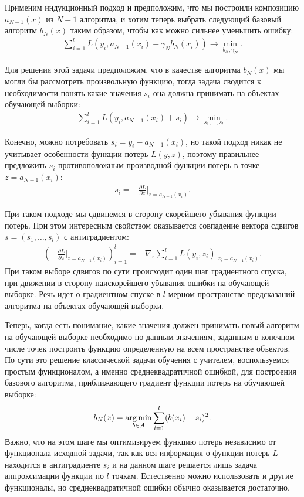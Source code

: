 \documentclass[12pt,a4paper]{article} %
\begin{document}
Применим индукционный подход и предположим, что мы построили композицию $a_{N-1}(x)$ из $N-1$ алгоритма, и хотим теперь выбрать следующий базовый алгоритм $b_N(x)$ таким образом, чтобы как можно сильнее уменьшить ошибку:
\begin{gather}\label{gradbust3}
	\sum\limits_{i=1}^{l}L(y_i, a_{N-1}(x_i)+\gamma_Nb_N(x_i)) \rightarrow \min_{b_N, \gamma_N}.
\end{gather}

Для решения этой задачи предположим, что в качестве алгоритма $b_N(x)$ мы могли бы рассмотреть произвольную функцию, тогда задача сводится к необходимости понять какие значения $s_i$ она должна принимать на  объектах обучающей выборки:
\begin{gather}\label{gradbust4}
	\sum\limits_{i=1}^{l}L(y_i, a_{N-1}(x_i)+s_i) \rightarrow \min_{s_1, \dots, s_l}.
\end{gather}

Конечно, можно потребовать $s_i = y_i-a_{N-1}(x_i)$, но такой подход никак не учитывает особенности функции потерь $L(y,z)$, поэтому правильнее предложить $s_i$ противоположным производной функции потерь в точке $z=a_{N-1}(x_i)$:
\begin{gather}\label{gradbust5}
	s_i = -\frac{\partial L}{\partial z}\bigg|_{z = a_{N-1}(x_i)}.
\end{gather}

При таком подходе мы сдвинемся в сторону скорейшего убывания функции потерь. При этом интересным свойством оказывается совпадение вектора сдвигов $s = (s_1,\dots, s_l)$ с антиградиентом:
\begin{gather}\label{gradbust6}
	\left(-\frac{\partial L}{\partial z}\bigg|_{z = a_{N-1}(x_i)}\right)_{i=1}^{l} = -\nabla_z\sum\limits_{i=1}^{l}L(y_i, z_i)|_{z_i = a_{N-1}(x_i)}.
\end{gather}
При таком выборе сдвигов по сути происходит один шаг градиентного спуска, при движении в сторону наискорейшего убывания ошибки на обучающей выборке. Речь идет о градиентном спуске в $l$-мерном пространстве предсказаний алгоритма на объектах обучающей выборки. 

Теперь, когда есть понимание, какие значения должен принимать новый алгоритм на обучающей выборке необходимо по данным значениям, заданным в конечном числе точек построить функцию определенную на всем пространстве объектов. По сути это решение классической задачи обучения с учителем, воспользуемся простым функционалом, а именно среднеквадратичной ошибкой, для построения базового алгоритма, приближающего градиент функции потерь на обучающей выборке:
\begin{gather}\label{gradbust7}
	b_N(x) = \mathop{\rm arg\,min}\limits_{b\in\mathcal{A}} \sum\limits_{i=1}^{l}(b(x_i)-s_i)^2.
\end{gather}
Важно, что на этом шаге мы оптимизируем функцию потерь независимо от функционала исходной задачи, так как вся информация о функции потерь $L$ находится в антиградиенте 
$s_i$ и на данном шаге решается лишь задача аппроксимации функции по $l$ точкам. Естественно можно использовать и другие функционалы, но среднеквадратичной ошибки обычно оказывается достаточно. 
\end{document}
